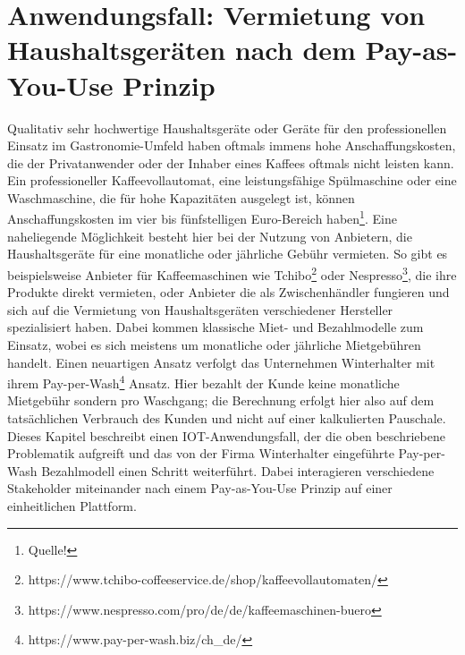 \chapter{Anwendungsfall: Vermietung von Haushaltsgeräten nach dem Pay-as-You-Use Prinzip}
\label{ch:iot_usecase}
Qualitativ sehr hochwertige Haushaltsgeräte oder Geräte für den professionellen Einsatz im Gastronomie-Umfeld haben oftmals immens hohe Anschaffungskosten, die der Privatanwender oder der Inhaber eines Kaffees oftmals nicht leisten kann. Ein professioneller Kaffeevollautomat, eine leistungsfähige Spülmaschine oder eine Waschmaschine, die für hohe Kapazitäten ausgelegt ist, können Anschaffungskosten im vier bis fünfstelligen Euro-Bereich haben\footnote{Quelle!}. Eine naheliegende Möglichkeit besteht hier bei der Nutzung von Anbietern, die Haushaltsgeräte für eine monatliche oder jährliche Gebühr vermieten. So gibt es beispielsweise Anbieter für Kaffeemaschinen wie Tchibo\footnote{https://www.tchibo-coffeeservice.de/shop/kaffeevollautomaten/} oder Nespresso\footnote{https://www.nespresso.com/pro/de/de/kaffeemaschinen-buero}, die ihre Produkte direkt vermieten, oder Anbieter die als Zwischenhändler fungieren und sich auf die Vermietung von Haushaltsgeräten verschiedener Hersteller spezialisiert haben. Dabei kommen klassische Miet- und Bezahlmodelle zum Einsatz, wobei es sich meistens um monatliche oder jährliche Mietgebühren handelt. Einen neuartigen Ansatz verfolgt das Unternehmen Winterhalter mit ihrem Pay-per-Wash\footnote{https://www.pay-per-wash.biz/ch\_de/} Ansatz. Hier bezahlt der Kunde keine monatliche Mietgebühr sondern pro Waschgang; die Berechnung erfolgt hier also auf dem tatsächlichen Verbrauch des Kunden und nicht auf einer kalkulierten Pauschale.\\
Dieses Kapitel beschreibt einen IOT-Anwendungsfall, der die oben beschriebene Problematik aufgreift und das von der Firma Winterhalter eingeführte Pay-per-Wash Bezahlmodell einen Schritt weiterführt. Dabei interagieren verschiedene Stakeholder miteinander nach einem Pay-as-You-Use Prinzip auf einer einheitlichen Plattform.

%
%

